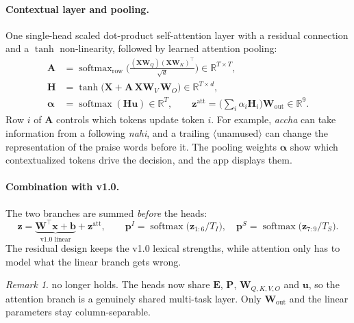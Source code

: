 \documentclass[11pt,a4paper]{article}
\theoremstyle{remark}
\newtheorem*{remark}{Remark}
\newcommand{\hi}[1]{\textit{#1}}                       %
\newcommand{\emo}[1]{\textsf{\small$\langle$#1$\rangle$}} %
\newcommand{\R}{\mathbb{R}}
\newcommand{\x}{\bm{x}}
\newcommand{\W}{\bm{W}}
\newcommand{\bb}{\bm{b}}
\newcommand{\z}{\bm{z}}
\newcommand{\p}{\bm{p}}
\DeclareMathOperator{\softmax}{softmax}
\begin{document}
\paragraph{Contextual layer and pooling.} One single-head scaled dot-product
self-attention layer with a residual connection and a $\tanh$ non-linearity,
followed by learned attention pooling:
\begin{align}
  \bm A &= \softmax_{\text{row}}\!\Big(\frac{(\bm X\bm W_Q)(\bm X\bm W_K)^{\!\top}}{\sqrt d}\Big) \in \R^{T\times T}, \label{eq:v11attn}\\
  \bm H &= \tanh\!\big(\bm X + \bm A\,\bm X\bm W_V\,\bm W_O\big) \in \R^{T\times d}, \label{eq:v11ctx}\\
  \bm\alpha &= \softmax(\bm H\bm u)\in\R^{T},\qquad
  \z^{\text{att}} = \Big(\textstyle\sum_{i}\alpha_i\bm H_i\Big)\bm W_{\text{out}}\in\R^{9}. \label{eq:v11pool}
\end{align}
Row $i$ of $\bm A$ controls which tokens update token $i$. For example, \hi{accha}
can take information from a following \hi{nahi}, and a trailing \emo{unamused}
can change the representation of the praise words before it. The pooling
weights $\bm\alpha$ show which contextualized tokens drive the decision, and
the app displays them.

\paragraph{Combination with v1.0.} The two branches are summed \emph{before}
the heads:
\begin{equation}
  \z = \underbrace{\W^{\!\top}\x + \bb}_{\text{v1.0 linear}} + \z^{\text{att}},\qquad
  \p^{I} = \softmax\!\big(\z_{1:6}/T_I\big),\quad
  \p^{S} = \softmax\!\big(\z_{7:9}/T_S\big).
  \label{eq:v11sum}
\end{equation}
The residual design keeps the v1.0 lexical strengths, while attention only
has to model what the linear branch gets wrong.

\begin{remark}
 no longer holds. The heads now share $\bm E$, $\bm P$,
$\bm W_{Q,K,V,O}$ and $\bm u$, so the attention branch is a genuinely shared
multi-task layer. Only $\W_{\text{out}}$ and the linear parameters stay
column-separable.
\end{remark}
\end{document}
